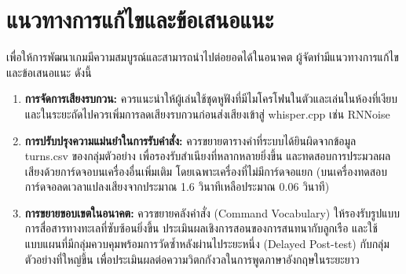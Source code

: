 \section{แนวทางการแก้ไขและข้อเสนอแนะ}

เพื่อให้การพัฒนาเกมมีความสมบูรณ์และสามารถนำไปต่อยอดได้ในอนาคต ผู้จัดทำมีแนวทางการแก้ไขและข้อเสนอแนะ ดังนี้

\begin{enumerate}[label=\arabic*)]
    \item \textbf{การจัดการเสียงรบกวน:} ควรแนะนำให้ผู้เล่นใช้ชุดหูฟังที่มีไมโครโฟนในตัวและเล่นในห้องที่เงียบ และในระยะถัดไปควรเพิ่มการลดเสียงรบกวนก่อนส่งเสียงเข้าสู่ whisper.cpp เช่น RNNoise
    \item \textbf{การปรับปรุงความแม่นยำในการรับคำสั่ง:} ควรขยายตารางคำที่ระบบได้ยินผิดจากข้อมูล turns.csv ของกลุ่มตัวอย่าง เพื่อรองรับสำเนียงที่หลากหลายยิ่งขึ้น และทดสอบการประมวลผลเสียงด้วยการ์ดจอบนเครื่องอื่นเพิ่มเติม โดยเฉพาะเครื่องที่ไม่มีการ์ดจอแยก (บนเครื่องทดสอบ การ์ดจอลดเวลาแปลงเสียงจากประมาณ 1.6 วินาทีเหลือประมาณ 0.06 วินาที)
    \item \textbf{การขยายขอบเขตในอนาคต:} ควรขยายคลังคำสั่ง (Command Vocabulary) ให้รองรับรูปแบบการสื่อสารทางทะเลที่ซับซ้อนยิ่งขึ้น ประเมินผลเชิงการสอนของการสนทนากับลูกเรือ และใช้แบบแผนที่มีกลุ่มควบคุมพร้อมการวัดซ้ำหลังผ่านไประยะหนึ่ง (Delayed Post-test) กับกลุ่มตัวอย่างที่ใหญ่ขึ้น เพื่อประเมินผลต่อความวิตกกังวลในการพูดภาษาอังกฤษในระยะยาว
\end{enumerate}